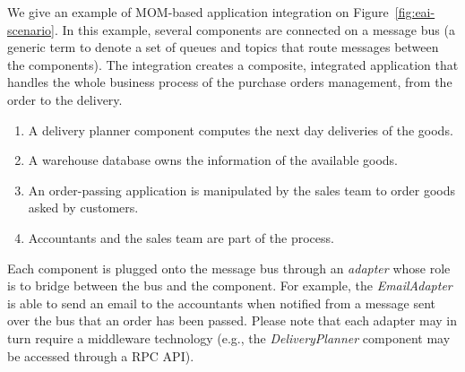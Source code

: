 We give an example of MOM-based application integration on Figure~\ref{fig:eai-scenario}. In this example, several components are connected on a message bus (a generic term to denote a set of queues and topics that route messages between the components). The integration creates a composite, integrated application that handles the whole business process of the purchase orders management, from the order to the delivery.
\begin{enumerate}
  
  \item A delivery planner component computes the next day deliveries of the goods.
  
  \item A warehouse database owns the information of the available goods.
  
  \item An order-passing application is manipulated by the sales team to order goods asked by customers.
  
  \item Accountants and the sales team are part of the process.
  
\end{enumerate}
Each component is plugged onto the message bus through an \emph{adapter} whose role is to bridge between the bus and the component. For example, the \emph{EmailAdapter} is able to send an email to the accountants when notified from a message sent over the bus that an order has been passed. Please note that each adapter may in turn require a middleware technology (e.g., the \emph{DeliveryPlanner} component may be accessed through a RPC API).\\

